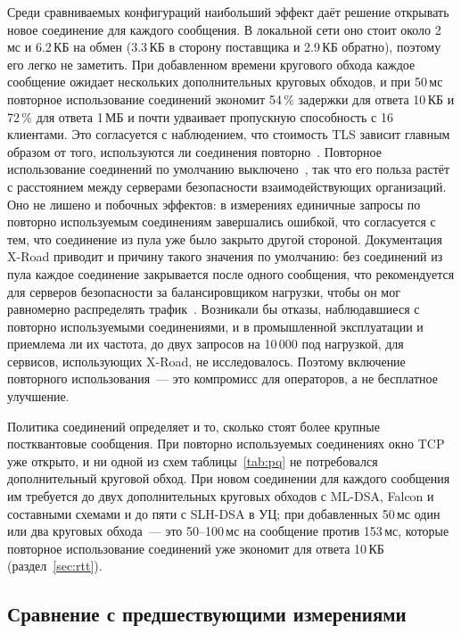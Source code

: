 \documentclass[conference,a4paper]{IEEEtran}
\newcommand{\newtext}[1]{{\color{blue}#1}}
\newcommand{\newgreen}[1]{{\color{green!50!black}#1}}
\begin{document}
Среди сравниваемых конфигураций наибольший эффект даёт решение открывать новое соединение для
каждого сообщения. В локальной сети оно стоит около 2\,мс и 6.2\,КБ на обмен (3.3\,КБ в сторону поставщика
и 2.9\,КБ обратно),
поэтому его легко не заметить. При добавленном времени кругового обхода каждое сообщение ожидает нескольких
дополнительных круговых обходов, и при 50\,мс повторное использование соединений экономит 54\,\% задержки для ответа
10\,КБ и 72\,\% для ответа 1\,МБ и почти удваивает пропускную способность с 16 клиентами. Это
согласуется с наблюдением, что стоимость TLS зависит главным образом от того, используются ли соединения
повторно~\cite{naylor2014}. Повторное использование соединений по умолчанию выключено~\cite{xroadsyspar}, так что его польза растёт
с расстоянием между серверами безопасности взаимодействующих организаций. Оно не лишено и
побочных эффектов: в измерениях единичные запросы по повторно используемым соединениям завершались ошибкой, что согласуется
с тем, что соединение из пула уже было закрыто другой стороной. \newtext{Документация
X-Road приводит и причину такого значения по умолчанию: без соединений из пула каждое соединение закрывается
после одного сообщения, что рекомендуется для серверов безопасности за балансировщиком нагрузки, чтобы он мог
равномерно распределять трафик~\cite{xroadsyspar,xroadxlb}. Возникали бы отказы, наблюдавшиеся с повторно используемыми
соединениями, и в промышленной эксплуатации и приемлема ли их частота, \newgreen{до} двух запросов на 10\,000
под нагрузкой, для сервисов, использующих X-Road, не исследовалось. Поэтому включение повторного использования~---
это компромисс для операторов, а не бесплатное улучшение.}

Политика соединений определяет и то, сколько стоят более крупные постквантовые сообщения. \newtext{При повторно используемых
соединениях окно TCP уже открыто, и ни одной из схем таблицы~\ref{tab:pq} не потребовался
дополнительный круговой обход. При новом соединении для каждого сообщения им требуется до двух дополнительных круговых
обходов с ML-DSA, Falcon и составными схемами и до пяти с SLH-DSA в УЦ; при добавленных
50\,мс один или два круговых обхода~--- это 50--100\,мс на сообщение против 153\,мс, которые повторное использование
соединений уже экономит для ответа 10\,КБ (\newgreen{раздел~\ref{sec:rtt}}).}

\subsection{Сравнение с предшествующими измерениями}
\end{document}
